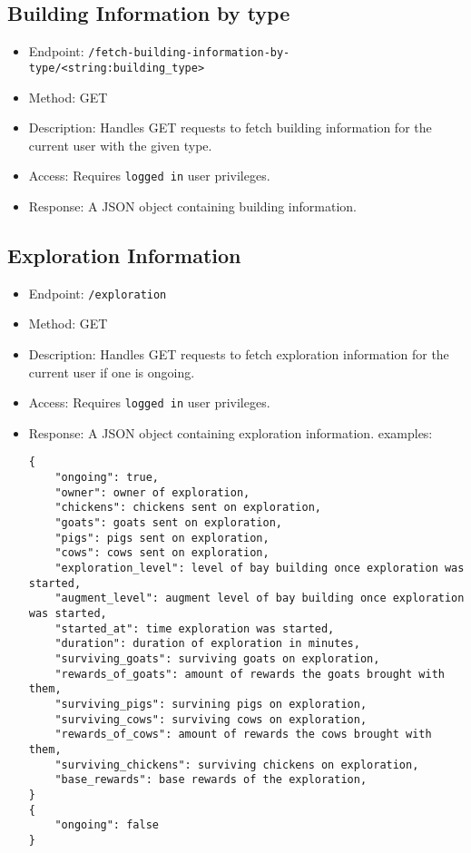 \documentclass[12pt]{article}
\begin{document}
\subsection{Building Information by type}
\begin{itemize}
    \item Endpoint: \texttt{/fetch-building-information-by-type/<string:building_type>}
    \item Method: GET
    \item {Description:} Handles GET requests to fetch building information for the current user with the given type.
    \item {Access:} Requires \texttt{logged in} user privileges.
    \item {Response:} A JSON object containing building information.
\end{itemize}

\subsection{Exploration Information}
\begin{itemize}
    \item Endpoint: \texttt{/exploration}
    \item Method: GET
    \item {Description:} Handles GET requests to fetch exploration information for the current user if one is ongoing.
    \item {Access:} Requires \texttt{logged in} user privileges.
    \item {Response:} A JSON object containing exploration information. examples:
    \begin{verbatim}
{
    "ongoing": true,
    "owner": owner of exploration,
    "chickens": chickens sent on exploration,
    "goats": goats sent on exploration,
    "pigs": pigs sent on exploration,
    "cows": cows sent on exploration,
    "exploration_level": level of bay building once exploration was started,
    "augment_level": augment level of bay building once exploration was started,
    "started_at": time exploration was started,
    "duration": duration of exploration in minutes,
    "surviving_goats": surviving goats on exploration,
    "rewards_of_goats": amount of rewards the goats brought with them,
    "surviving_pigs": survining pigs on exploration,
    "surviving_cows": surviving cows on exploration,
    "rewards_of_cows": amount of rewards the cows brought with them,
    "surviving_chickens": surviving chickens on exploration,
    "base_rewards": base rewards of the exploration,
}
{
    "ongoing": false
}
    \end{verbatim}
\end{itemize}
\end{document}
